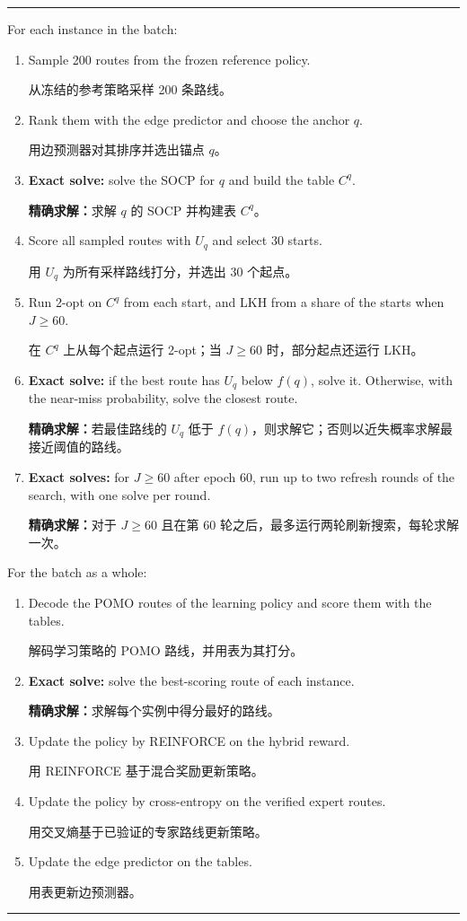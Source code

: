 \documentclass[preprint,12pt,authoryear]{elsarticle}
\newcommand{\zhitem}[1]{\par{\color{zhc}#1}}
\DeclareRobustCommand{\zhcap}[1]{{\color{zhc}#1}}
\begin{document}
\begin{table}[!htbp]
\caption{One training step for a batch of instances. Exact solves are marked.\protect\newline\zhcap{一批实例的一个训练步骤。精确求解已标出。}}
\label{alg:train}
\small
\hrule\smallskip
\noindent For each instance in the batch:
\begin{enumerate}
\setlength{\itemsep}{0pt}
\item Sample 200 routes from the frozen reference policy. \zhitem{从冻结的参考策略采样 200 条路线。}
\item Rank them with the edge predictor and choose the anchor $q$. \zhitem{用边预测器对其排序并选出锚点 $q$。}
\item \textbf{Exact solve:} solve the SOCP for $q$ and build the table $C^{q}$. \zhitem{\textbf{精确求解：}求解 $q$ 的 SOCP 并构建表 $C^{q}$。}
\item Score all sampled routes with $U_{q}$ and select 30 starts. \zhitem{用 $U_{q}$ 为所有采样路线打分，并选出 30 个起点。}
\item Run 2-opt on $C^{q}$ from each start, and LKH from a share of the starts when $J \ge 60$. \zhitem{在 $C^{q}$ 上从每个起点运行 2-opt；当 $J \ge 60$ 时，部分起点还运行 LKH。}
\item \textbf{Exact solve:} if the best route has $U_{q}$ below $f(q)$, solve it. Otherwise, with the near-miss probability, solve the closest route. \zhitem{\textbf{精确求解：}若最佳路线的 $U_{q}$ 低于 $f(q)$，则求解它；否则以近失概率求解最接近阈值的路线。}
\item \textbf{Exact solves:} for $J \ge 60$ after epoch 60, run up to two refresh rounds of the search, with one solve per round. \zhitem{\textbf{精确求解：}对于 $J \ge 60$ 且在第 60 轮之后，最多运行两轮刷新搜索，每轮求解一次。}
\end{enumerate}
\noindent For the batch as a whole:
\begin{enumerate}
\setlength{\itemsep}{0pt}
\setcounter{enumi}{7}
\item Decode the POMO routes of the learning policy and score them with the tables. \zhitem{解码学习策略的 POMO 路线，并用表为其打分。}
\item \textbf{Exact solve:} solve the best-scoring route of each instance. \zhitem{\textbf{精确求解：}求解每个实例中得分最好的路线。}
\item Update the policy by REINFORCE on the hybrid reward. \zhitem{用 REINFORCE 基于混合奖励更新策略。}
\item Update the policy by cross-entropy on the verified expert routes. \zhitem{用交叉熵基于已验证的专家路线更新策略。}
\item Update the edge predictor on the tables. \zhitem{用表更新边预测器。}
\end{enumerate}
\hrule
\end{table}
\end{document}
